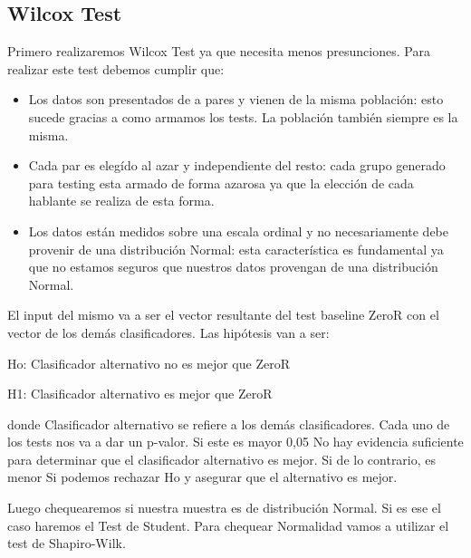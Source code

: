 \subsection{Wilcox Test}

Primero realizaremos Wilcox Test ya que necesita menos presunciones. Para realizar este test debemos cumplir que:

\begin{itemize}
    \item Los datos son presentados de a pares y vienen de la misma población: esto sucede gracias a como armamos los tests. La población también siempre es la misma.
    \item Cada par es elegído al azar y independiente del resto: cada grupo generado para testing esta armado de forma azarosa ya que la elección de cada hablante se realiza de esta forma.
    \item Los datos están medidos sobre una escala ordinal y no necesariamente debe provenir de una distribución Normal: esta característica es fundamental ya que no estamos seguros que nuestros datos provengan de una distribución Normal.
\end{itemize}

El input del mismo va a ser el vector resultante del test baseline ZeroR con el vector de los demás clasificadores. Las hipótesis van a ser:

\vspace{0.5cm}
\hspace{2cm}Ho: Clasificador alternativo no es mejor que ZeroR
\vspace{0.25cm}

\hspace{2cm}H1: Clasificador alternativo es mejor que ZeroR
\vspace{0.5cm}

donde Clasificador alternativo se refiere a los demás clasificadores. 
Cada uno de los tests nos va a dar un p-valor.
Si este es mayor 0,05 No hay evidencia suficiente para determinar que el clasificador alternativo es mejor.
Si de lo contrario, es menor Si podemos rechazar Ho y asegurar que el alternativo es mejor. 

Luego chequearemos si nuestra muestra es de distribución Normal. Si es ese el caso haremos el Test de Student. Para chequear Normalidad vamos a utilizar el test de Shapiro-Wilk.

